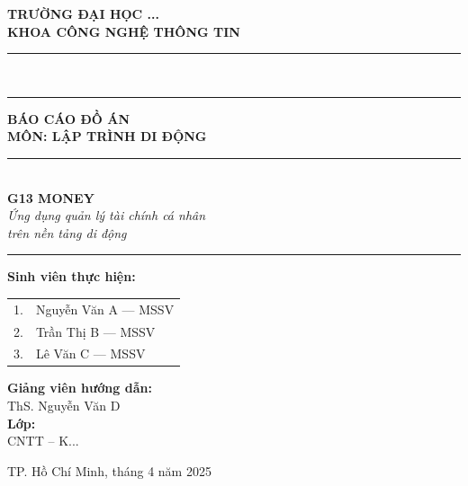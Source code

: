 \begin{titlepage}
\begin{center}

\textbf{\large TRƯỜNG ĐẠI HỌC ...}\\[4pt]
\textbf{\large KHOA CÔNG NGHỆ THÔNG TIN}\\[4pt]
\rule{\textwidth}{1.5pt}\\[0.3pt]
\rule{\textwidth}{0.4pt}

\vspace{2cm}

{\Huge\bfseries BÁO CÁO ĐỒ ÁN}\\[0.8cm]
{\LARGE\bfseries MÔN: LẬP TRÌNH DI ĐỘNG}\\[1.5cm]

\rule{0.6\textwidth}{0.5pt}\\[0.8cm]
{\huge\bfseries G13 MONEY}\\[0.4cm]
{\Large\itshape Ứng dụng quản lý tài chính cá nhân\\trên nền tảng di động}\\[0.4cm]
\rule{0.6\textwidth}{0.5pt}

\vspace{2cm}

\begin{minipage}[t]{0.48\textwidth}
\raggedright
\textbf{Sinh viên thực hiện:}\\[8pt]
\begin{tabular}{ll}
1. & Nguyễn Văn A --- MSSV \\
2. & Trần Thị B --- MSSV \\
3. & Lê Văn C --- MSSV \\
\end{tabular}
\end{minipage}
\hfill
\begin{minipage}[t]{0.44\textwidth}
\raggedright
\textbf{Giảng viên hướng dẫn:}\\[8pt]
ThS. Nguyễn Văn D\\[20pt]
\textbf{Lớp:}\\[8pt]
CNTT -- K...
\end{minipage}

\vfill

{\large TP. Hồ Chí Minh, tháng 4 năm 2025}

\end{center}
\end{titlepage}
